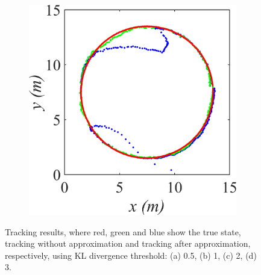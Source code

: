 \begin{figure}
\begin{subfigure}[tb]{0.2\textwidth}
        \caption{}
    \end{subfigure}
        \begin{subfigure}[tb]{0.2\textwidth}
        \includegraphics[width=\textwidth]{img/KL_3.png}
        \caption{}
    \end{subfigure}
    \caption{Tracking results, where red, green and blue show the true state, tracking without approximation and tracking after approximation, respectively, using KL divergence threshold: (a) 0.5, (b) 1, (c) 2, (d) 3.}
    \label{fig:track_res}
\end{figure}







